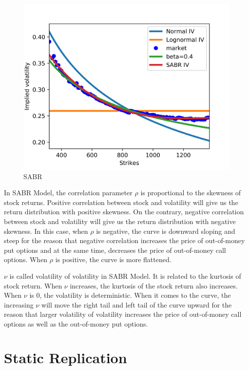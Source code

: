 \documentclass[fleqn,12pt]{SelfArx}
\begin{document}
\begin{figure}[ht]\centering
	\includegraphics{SABR}
	\caption{SABR}
\end{figure}

\noindent In SABR Model, the correlation parameter $\rho$ is proportional to the skewness of stock returns. Positive correlation between stock and volatility will give us the return distribution with positive skewness. On the contrary, negative correlation between stock and volatility will give us the return distribution with negative skewness. In this case, when $\rho$ is negative, the curve is downward sloping and steep for the reason that negative correlation increases the price of out-of-money put options and at the same time, decreases the price of out-of-money call options. When $\rho$ is positive, the curve is more flattened. 

\noindent $\nu$ is called volatility of volatility in SABR Model. It is related to the kurtosis of stock return. When $\nu$ increases, the kurtosis of the stock return also increases. When $\nu$ is 0, the volatility is deterministic. When it comes to the curve, the increasing $\nu$ will move the right tail and left tail of the curve upward for the reason that larger volatility of volatility increases the price of out-of-money call options as well as the out-of-money put options. 

\newpage
\section{Static Replication}
\end{document}
